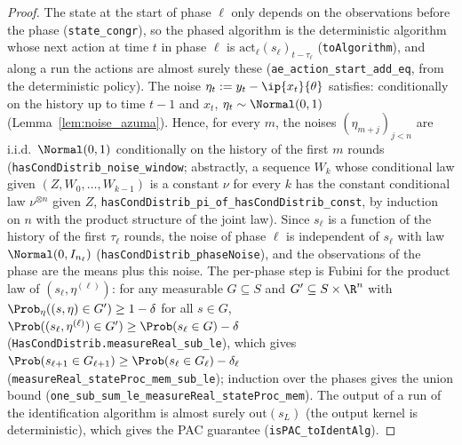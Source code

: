 \begin{proof}
\leanok
{}
The state at the start of phase $\ell$ only depends on the observations before the phase
(\texttt{state\_congr}), so the phased algorithm is the deterministic algorithm whose next
action at time $t$ in phase $\ell$ is $\mathrm{act}_\ell(s_\ell)_{t - \tau_\ell}$
(\texttt{toAlgorithm}), and along a run the actions are almost surely these
(\texttt{ae\_action\_start\_add\_eq}, from the deterministic policy).
The noise $\eta_t := y_t - \ip{x_t}{\theta}$ satisfies: conditionally on the history up to
time $t - 1$ and $x_t$, $\eta_t \sim \Normal(0,1)$ (Lemma~\ref{lem:noise_azuma}). Hence, for
every $m$, the noises $(\eta_{m+j})_{j < n}$ are i.i.d.\ $\Normal(0,1)$ conditionally on the
history of the first $m$ rounds (\texttt{hasCondDistrib\_noise\_window}; abstractly, a
sequence $W_k$ whose conditional law given $(Z, W_0, \dots, W_{k-1})$ is a constant $\nu$ for
every $k$ has the constant conditional law $\nu^{\otimes n}$ given $Z$,
\texttt{hasCondDistrib\_pi\_of\_hasCondDistrib\_const}, by induction on $n$ with the product
structure of the joint law). Since $s_\ell$ is a function of the history of the first
$\tau_\ell$ rounds, the noise of phase $\ell$ is independent of $s_\ell$ with law
$\Normal(0, I_{n_\ell})$ (\texttt{hasCondDistrib\_phaseNoise}), and the observations of the
phase are the means plus this noise. The per-phase step is Fubini for the product law of
$(s_\ell, \eta^{(\ell)})$: for any measurable $G \subseteq S$ and $G' \subseteq S \times \R^n$
with $\Prob_\eta((s, \eta) \in G') \ge 1 - \delta$ for all $s \in G$,
$\Prob((s_\ell, \eta^{(\ell)}) \in G') \ge \Prob(s_\ell \in G) - \delta$
(\texttt{HasCondDistrib.measureReal\_sub\_le}), which gives
$\Prob(s_{\ell+1} \in G_{\ell+1}) \ge \Prob(s_\ell \in G_\ell) - \delta_\ell$
(\texttt{measureReal\_stateProc\_mem\_sub\_le}); induction over the phases gives the union
bound (\texttt{one\_sub\_sum\_le\_measureReal\_stateProc\_mem}). The output of a run of the
identification algorithm is almost surely $\mathrm{out}(s_L)$ (the output kernel is
deterministic), which gives the PAC guarantee (\texttt{isPAC\_toIdentAlg}).
\end{proof}
